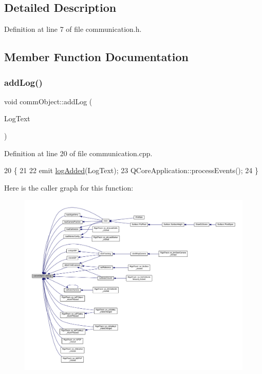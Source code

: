 \subsection{Detailed Description}


Definition at line 7 of file communication.\+h.



\subsection{Member Function Documentation}
\mbox{\label{classcomm_object_aec354c7099b3039083cc4224e071e022}} 
\subsubsection{\texorpdfstring{add\+Log()}{addLog()}}
{\footnotesize\ttfamily void comm\+Object\+::add\+Log (\begin{DoxyParamCaption}\item[{Q\+String}]{Log\+Text }\end{DoxyParamCaption})}



Definition at line 20 of file communication.\+cpp.


\begin{DoxyCode}
20                                        \{
21 
22     emit \hyperlink{classcomm_object_a72620fe1bac16309baf6d148644edaf9}{logAdded}(LogText);
23     QCoreApplication::processEvents();
24 \}
\end{DoxyCode}
Here is the caller graph for this function\+:
\nopagebreak
\begin{figure}[H]
\begin{center}
\leavevmode
\includegraphics[width=350pt]{classcomm_object_aec354c7099b3039083cc4224e071e022_icgraph}
\end{center}
\end{figure}
\mbox{\label{classcomm_object_a6f81522c2aa1668fa402f08710e6206b}} 
